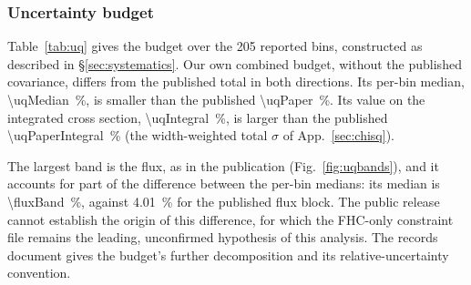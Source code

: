 \subsubsection{Uncertainty budget}
\label{sec:results-uq}
Table~\ref{tab:uq} gives the budget over the 205 reported bins, constructed as described in \S\ref{sec:systematics}. Our own combined budget, without the published covariance, differs from the published total in both directions. Its per-bin median, \SI{\uqMedian}{\percent}, is smaller than the published \SI{\uqPaper}{\percent}. Its value on the integrated cross section, \SI{\uqIntegral}{\percent}, is larger than the published \SI{\uqPaperIntegral}{\percent} (the width-weighted total $\sigma$ of App.~\ref{sec:chisq}).

The largest band is the flux, as in the publication (Fig.~\ref{fig:uqbands}), and it accounts for part of the difference between the per-bin medians: its median is \SI{\fluxBand}{\percent}, against \SI{4.01}{\percent} for the published flux block. The public release cannot establish the origin of this difference, for which the FHC-only constraint file remains the leading, unconfirmed hypothesis of this analysis. The records document gives the budget's further decomposition and its relative-uncertainty convention.

